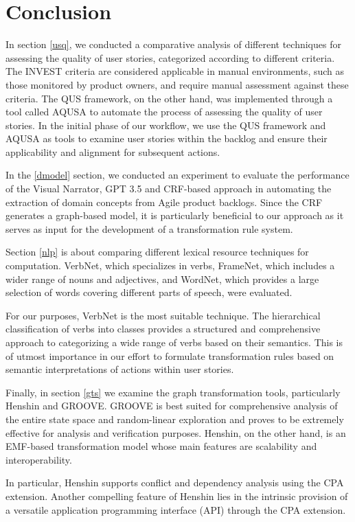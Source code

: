 \section{Conclusion}\label{Conclusion}
In section \ref{usq}, we conducted a comparative analysis of different techniques for assessing the quality of user stories, categorized according to different criteria. The INVEST criteria are considered applicable in manual environments, such as those monitored by product owners, and require manual assessment against these criteria. The QUS framework, on the other hand, was implemented through a tool called AQUSA to automate the process of assessing the quality of user stories. In the initial phase of our workflow, we use the QUS framework and AQUSA as tools to examine user stories within the backlog and ensure their applicability and alignment for subsequent actions.

In the \ref{dmodel} section, we conducted an experiment to evaluate the performance of the Visual Narrator, GPT 3.5 and CRF-based approach in automating the extraction of domain concepts from Agile product backlogs. Since the CRF generates a graph-based model, it is particularly beneficial to our approach as it serves as input for the development of a transformation rule system.

Section \ref{nlp} is about comparing different lexical resource techniques for computation. VerbNet, which specializes in verbs, FrameNet, which includes a wider range of nouns and adjectives, and WordNet, which provides a large selection of words covering different parts of speech, were evaluated.

For our purposes, VerbNet is the most suitable technique. The hierarchical classification of verbs into classes provides a structured and comprehensive approach to categorizing a wide range of verbs based on their semantics. This is of utmost importance in our effort to formulate transformation rules based on semantic interpretations of actions within user stories.

Finally, in section \ref{gts} we examine the graph transformation tools, particularly Henshin and GROOVE. GROOVE is best suited for comprehensive analysis of the entire state space and random-linear exploration and proves to be extremely effective for analysis and verification purposes. Henshin, on the other hand, is an EMF-based transformation model whose main features are scalability and interoperability.

In particular, Henshin supports conflict and dependency analysis using the CPA extension. Another compelling feature of Henshin lies in the intrinsic provision of a versatile application programming interface (API) through the CPA extension.

